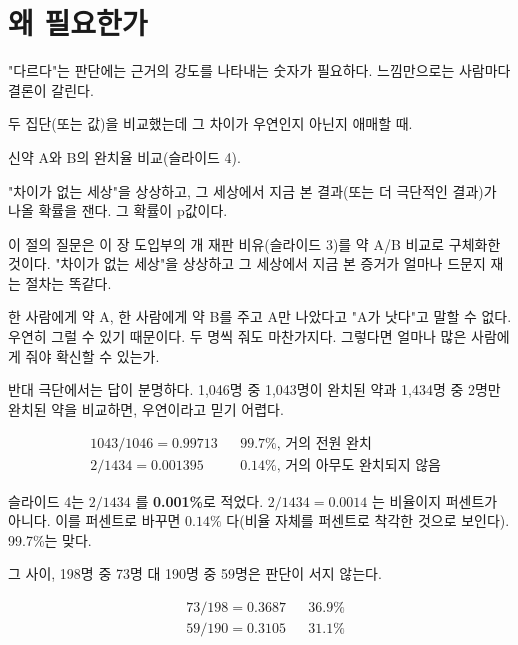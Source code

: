 \section{왜 필요한가}
\label{sec:pv-why}

\begin{inbrief}
  \item[Why] "다르다"는 판단에는 근거의 강도를 나타내는 숫자가 필요하다.
             느낌만으로는 사람마다 결론이 갈린다.
  \item[When] 두 집단(또는 값)을 비교했는데 그 차이가 우연인지 아닌지
              애매할 때.
  \item[Where] 신약 A와 B의 완치율 비교(슬라이드 4).
  \item[How] "차이가 없는 세상"을 상상하고, 그 세상에서 지금 본 결과(또는
             더 극단적인 결과)가 나올 확률을 잰다. 그 확률이 p값이다.
\end{inbrief}

이 절의 질문은 이 장 도입부의 개 재판 비유(슬라이드 3)를 약 A/B 비교로
구체화한 것이다. "차이가 없는 세상"을 상상하고 그 세상에서 지금 본
증거가 얼마나 드문지 재는 절차는 똑같다.

한 사람에게 약 A, 한 사람에게 약 B를 주고 A만 나았다고 "A가 낫다"고 말할 수
없다. 우연히 그럴 수 있기 때문이다. 두 명씩 줘도 마찬가지다. 그렇다면
얼마나 많은 사람에게 줘야 확신할 수 있는가.

반대 극단에서는 답이 분명하다. 1,046명 중 1,043명이 완치된 약과 1,434명 중
2명만 완치된 약을 비교하면, 우연이라고 믿기 어렵다.

\begin{align*}
  &1043/1046 = 0.99713 && \text{99.7\%, 거의 전원 완치}\\
  &2/1434 = 0.001395 && \text{0.14\%, 거의 아무도 완치되지 않음}
\end{align*}

\begin{pitfall}
슬라이드 4는 $2/1434$ 를 \textbf{0.001\%}로 적었다. $2/1434 = 0.0014$ 는
비율이지 퍼센트가 아니다. 이를 퍼센트로 바꾸면 $0.14\%$ 다(비율 자체를
퍼센트로 착각한 것으로 보인다). 99.7\%는 맞다.
\end{pitfall}

그 사이, 198명 중 73명 대 190명 중 59명은 판단이 서지 않는다.

\begin{align*}
  &73/198 = 0.3687 && \text{36.9\%}\\
  &59/190 = 0.3105 && \text{31.1\%}
\end{align*}

